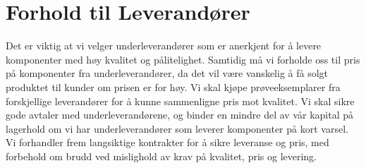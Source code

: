 \section{Forhold til Leverandører}
Det er viktig at vi velger underleverandører som er anerkjent for å levere komponenter med høy kvalitet og pålitelighet. Samtidig må vi forholde oss til pris på komponenter fra underleverandører, da det vil være vanskelig å få solgt produktet til kunder om prisen er for høy. Vi skal kjøpe prøveeksemplarer fra forskjellige leverandører for å kunne sammenligne pris mot kvalitet. Vi skal sikre gode avtaler med underleverandørene, og binder en mindre del av vår kapital på lagerhold om vi har underleverandører som leverer komponenter på kort varsel. Vi forhandler frem langsiktige kontrakter for å sikre leveranse og pris, med forbehold om brudd ved mislighold av krav på kvalitet, pris og levering. 
